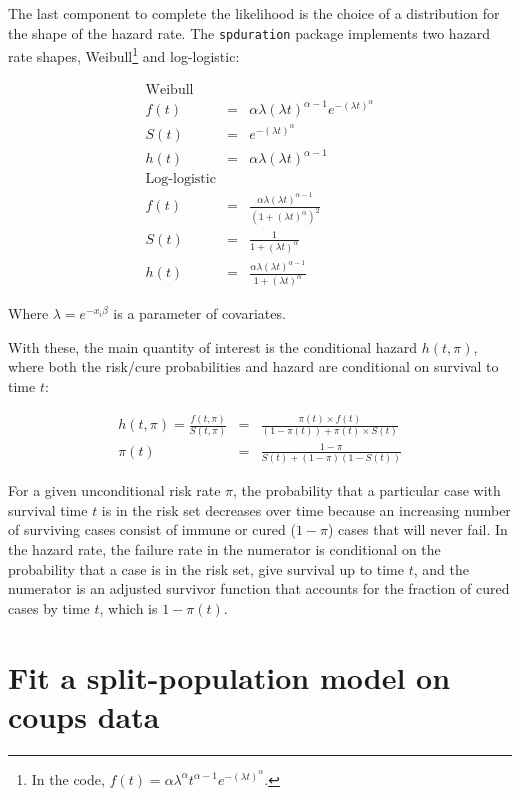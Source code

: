 \documentclass[]{article}
\let\rmarkdownfootnote\footnote%
\def\footnote{\protect\rmarkdownfootnote}
\begin{document}
The last component to complete the likelihood is the choice of a
distribution for the shape of the hazard rate. The \texttt{spduration}
package implements two hazard rate shapes,
Weibull\footnote{In the code, $f(t) = \alpha \lambda^{\alpha} t^{\alpha - 1} e^{-(\lambda t)^\alpha}$.}
and log-logistic:

\begin{eqnarray*}
\textrm{Weibull} \\
 f(t) & = & \alpha \lambda (\lambda t)^{\alpha - 1} e^{-(\lambda t)^\alpha} \\
  S(t) & = & e^{ -(\lambda t )^\alpha } \\
 h(t) & = & \alpha \lambda (\lambda t)^{\alpha-1} \\
\textrm{Log-logistic} \\
 f(t) & = & \frac{ \alpha \lambda (\lambda t)^{\alpha-1} }{ (1 + (\lambda t)^\alpha)^2 } \\
 S(t) & = & \frac{1}{ 1+  (\lambda t)^\alpha }  \\
 h(t) & = & \frac{ \alpha \lambda (\lambda t)^{\alpha-1} }{ 1+  (\lambda t)^\alpha }
\end{eqnarray*}

Where \(\lambda = e^{-x_i\beta}\) is a parameter of covariates.

With these, the main quantity of interest is the conditional hazard
\(h(t, \pi)\), where both the risk/cure probabilities and hazard are
conditional on survival to time \(t\):

\begin{eqnarray}
h(t, \pi) = \frac{f(t, \pi)}{S(t, \pi)} & = & \frac{ \pi(t) \times f(t) }{ (1-\pi(t)) + \pi(t) \times S(t) } \\
 \pi(t) & = & \frac{ 1-\pi }{ S(t) + (1-\pi) (1 - S(t)) }
\end{eqnarray}

For a given unconditional risk rate \(\pi\), the probability that a
particular case with survival time \(t\) is in the risk set decreases
over time because an increasing number of surviving cases consist of
immune or cured (\(1-\pi\)) cases that will never fail. In the hazard
rate, the failure rate in the numerator is conditional on the
probability that a case is in the risk set, give survival up to time
\(t\), and the numerator is an adjusted survivor function that accounts
for the fraction of cured cases by time \(t\), which is \(1-\pi(t)\).

\section{Fit a split-population model on coups
data}\label{fit-a-split-population-model-on-coups-data}
\end{document}

